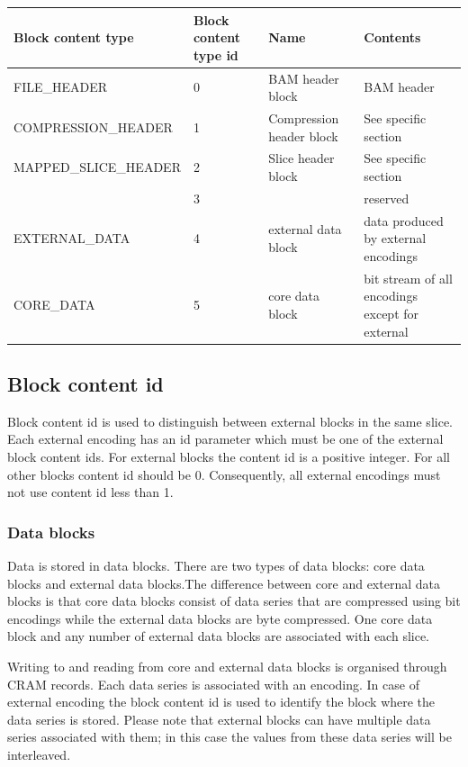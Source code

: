 \documentclass[a4paper]{article}
\begin{document}
\begin{tabular}{|>{\raggedright}p{143pt}|>{\raggedright}p{45pt}|>{\raggedright}p{116pt}|>{\raggedright}p{114pt}|}
\hline
\textbf{Block content type} & \textbf{Block content type id} & \textbf{Name} & \textbf{Contents}\tabularnewline
\hline
FILE\_HEADER & 0 & BAM header block & BAM header\tabularnewline
\hline
COMPRESSION\_HEADER & 1 & Compression header block & See specific section\tabularnewline
\hline
MAPPED\_SLICE\_HEADER & 2 & Slice header block & See specific section\tabularnewline
\hline
 & 3 &  & reserved\tabularnewline
\hline
EXTERNAL\_DATA & 4 & external data block & data produced by external encodings\tabularnewline
\hline
CORE\_DATA & 5 & core data block & bit stream of all encodings except for external\tabularnewline
\hline
\end{tabular}


\subsection{\textbf{Block content id}}

Block content id is used to distinguish between external blocks in the same slice. 
Each external encoding has an id parameter which must be one of the external block 
content ids. For external blocks the content id is a positive integer. For all 
other blocks content id should be 0. Consequently, all external encodings must 
not use content id less than 1. 

\subsubsection*{Data blocks}

Data is stored in data blocks. There are two types of data blocks: core data blocks 
and external data blocks.The difference between core and external data blocks is 
that core data blocks consist of data series that are compressed using bit encodings 
while the external data blocks are byte compressed. One core data block and any 
number of external data blocks are associated with each slice.

Writing to and reading from core and external data blocks is organised through 
CRAM records. Each data series is associated with an encoding. In case of external 
encoding the block content id is used to identify the block where the data series 
is stored. Please note that external blocks can have multiple data series associated 
with them; in this case the values from these data series will be interleaved. 
\end{document}
